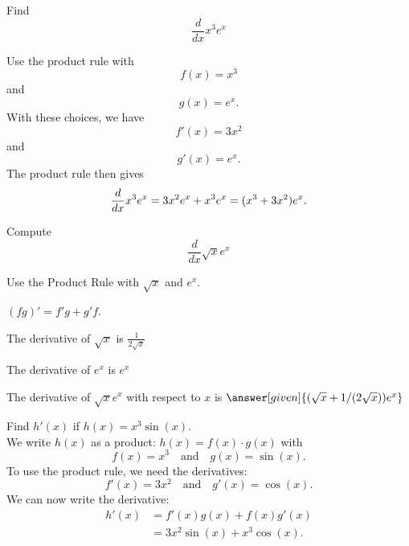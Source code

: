 \documentclass{ximera}
\begin{document}
\begin{example}
Find 
\[
\frac{d}{dx} x^3e^x
\]

Use the product rule with 
\[
f(x) = x^3
\]
and
\[
g(x) = e^x.
\]
With these choices, we have
\[
f'(x) = 3x^2
\]
and 
\[
g'(x) = e^x.
\]
The product rule then gives
\[
\frac{d}{dx}x^3e^x = 3x^2e^x + x^3e^x\\
=(x^3 + 3x^2)e^x.
\]
\end{example}

\begin{problem} %
  Compute
  \[
  \frac{d}{dx} \sqrt x e^x
  \]
  
    \begin{hint}
      Use the Product Rule with $\sqrt x$ and $e^x$.
    \end{hint}
    \begin{hint}
      $(fg)' = f'g+g'f$.
    \end{hint}
    \begin{hint}
      The derivative of $\sqrt x$ is $\frac{1}{2\sqrt x}$
    \end{hint}
    \begin{hint}
      The derivative of $e^x$ is $e^x$
    \end{hint}
    
		The derivative of $\sqrt x e^x$ with respect to $x$ is
		 $\answer[given]{(\sqrt x + 1/(2\sqrt x))e^x}$
		
\end{problem}




\begin{example} %
Find $h'(x)$ if $h(x) = x^3\sin(x)$.\\
We write $h(x)$ as a product: $h(x) = f(x)\cdot g(x)$ with 
\[f(x) = x^3 \quad \text{and} \quad g(x) = \sin(x).\]
To use the product rule, we need the derivatives:
\[f'(x) = 3x^2 \quad \text{and} \quad g'(x) = \cos(x).\]
We can now write the derivative:
\begin{align*}
h'(x) &= f'(x)g(x) + f(x)g'(x) \\
&= 3x^2\sin(x) + x^3\cos(x).
\end{align*}
\end{example}

\begin{center}
\begin{foldable}
\end{foldable}
\end{center}
\end{document}
